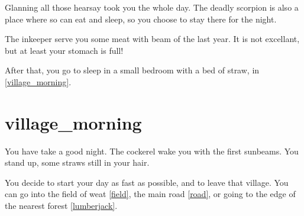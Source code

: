 Glanning all those hearsay took you the whole day. The deadly scorpion is also a
place where so can eat and sleep, so you choose to stay there for the night.

The inkeeper serve you some meat with beam of the last year. It is not
excellant, but at least your stomach is full!

After that, you go to sleep in a small bedroom with a bed of straw, in
\ref{village_morning}.

\section{village_morning}

You have take a good night. The cockerel wake you with the first sunbeams. You
stand up, some straws still in your hair.

You decide to start your day as fast as possible, and to leave that village.
You can go into the field of weat \ref{field}, the main road \ref{road}, or
going to the edge of the nearest forest \ref{lumberjack}. %

